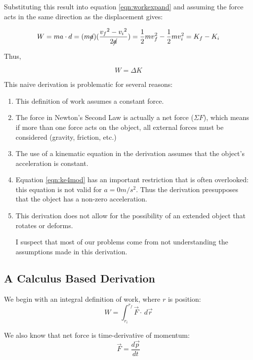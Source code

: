 \documentclass[letterpaper, 12pt]{article}
\begin{document}
Substituting this result into equation \ref{eqn:workexpand} and assuming the force acts in the same direction as the displacement gives:

\begin{equation}
	W = m {a} \cdot {d} =  (m \cancel{a}) (\frac{{v_f}^2 - {v_i}^2}{2 \cancel{a}}) = \frac{1}{2}mv_f^2 - \frac{1}{2}mv_i^2 = K_f - K_i 
	\label{eqn:workenergy}
\end{equation}

Thus, 

 \begin{equation}
 	W = \Delta K
 \end{equation}

This naive derivation is problematic for several reasons:
\begin{enumerate}
	\item This definition of work assumes a constant force.
	\item The force in Newton's Second Law is actually a net force ($\Sigma F$), which means if more than one force acts on the object, all external forces must be considered (gravity, friction, etc.)
	\item The use of a kinematic equation in the derivation assumes that the object's acceleration is constant. 
	\item Equation \ref{eqn:ke4mod} has an important restriction that is often overlooked: this equation is not valid for $a = 0 m/s^2$.  Thus the derivation presupposes that the object has a non-zero acceleration.  
	\item This derivation does not allow for the possibility of an extended object that rotates or deforms.  
	
	I suspect that most of our problems come from not understanding the assumptions made in this derivation.  
	
\end{enumerate}

\subsection{A Calculus Based Derivation}
We begin with an integral definition of work, where $r$ is position:
\begin{equation}
	W = \int_{r_i}^{r_f} \vec{F} \cdot \,d\vec{r}
		\label{eqn:workdefcalc}
\end{equation}

We also know that net force is time-derivative of momentum:
\begin{equation}
	\vec{F} = \frac{d\vec{p}}{dt}  
	\label{eqn:forcemomentum}
\end{equation}
\end{document}
